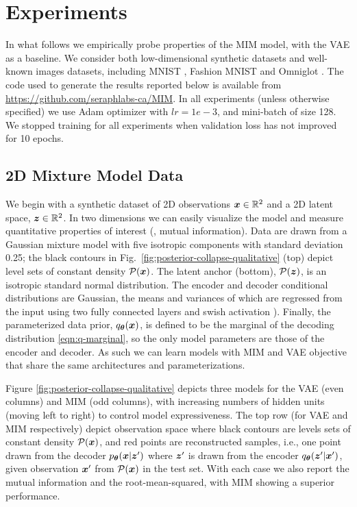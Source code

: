 \section{Experiments} \label{sec:experiments}

In what follows we empirically probe properties of the MIM model,
with the VAE as a baseline.  We consider both low-dimensional synthetic 
datasets and well-known images datasets, including MNIST \cite{LeCun1998}, 
Fashion MNIST \cite{DBLP:journals/corr/abs-1708-07747} and Omniglot \cite{Lake2015}. 
The code used to generate the results reported below is available 
from \href{https://github.com/seraphlabs-ca/MIM}{https://github.com/seraphlabs-ca/MIM}.
In all experiments (unless otherwise specified) we use Adam optimizer \cite{2014arXiv1412.6980K} with $lr = 1e-3$, and
mini-batch of size 128. We stopped training for all experiments when validation loss
has not improved for 10 epochs.

\subsection{2D Mixture Model Data} 
\label{sec:posterior-collapse-mim-vae}


We begin with a synthetic dataset of 2D observations ${\boldsymbol{x}} \in \mathbb{R}^2$
and a 2D latent space, ${\boldsymbol z} \in \mathbb{R}^2$. In two dimensions we can easily 
visualize the model and measure quantitative properties of interest (\eg, mutual information).
Data are drawn from a Gaussian mixture model with five isotropic components
with standard deviation 0.25; the black contours in Fig.\ \ref{fig:posterior-collapse-qualitative} (top) depict level sets of constant density $\mathcal{P}({\boldsymbol{x}})$. 
The latent anchor (bottom), $\mathcal{P}({\boldsymbol z})$, is an isotropic standard normal distribution.
The encoder and decoder conditional distributions are Gaussian, the means
and variances of which are regressed from the input using two fully 
connected layers and swish activation \cite{Ramachandran2017}).
Finally, the parameterized data prior, $q_{{\boldsymbol \theta}}({\boldsymbol{x}})$, is defined to be the 
marginal of the decoding distribution \eqref{eqn:q-marginal}, so
the only model parameters are those of the encoder and decoder.
As such we can learn models with MIM and VAE objective that share
the same architectures and parameterizations.

Figure \ref{fig:posterior-collapse-qualitative} depicts three models 
for the VAE (even columns) and MIM (odd columns), with increasing numbers 
of hidden units (moving left to right) to control model expressiveness.
The top row (for VAE and MIM respectively) depict observation 
space where black contours are levels sets of constant density 
$\mathcal{P} ({\boldsymbol{x}})$, and red points are reconstructed samples, 
i.e., one point drawn from the decoder $p_{{\boldsymbol \theta}}({\boldsymbol{x}} | {\boldsymbol z}' )$ where ${\boldsymbol z}'$ is 
drawn from the encoder $ q_{{\boldsymbol \theta}}({\boldsymbol z}' | {\boldsymbol{x}}') $, given observation ${\boldsymbol{x}}'$ 
from $\mathcal{P}({\boldsymbol{x}})$ in the test set.
With each case we also report the mutual information and the root-mean-squared,
with MIM showing a superior performance.


